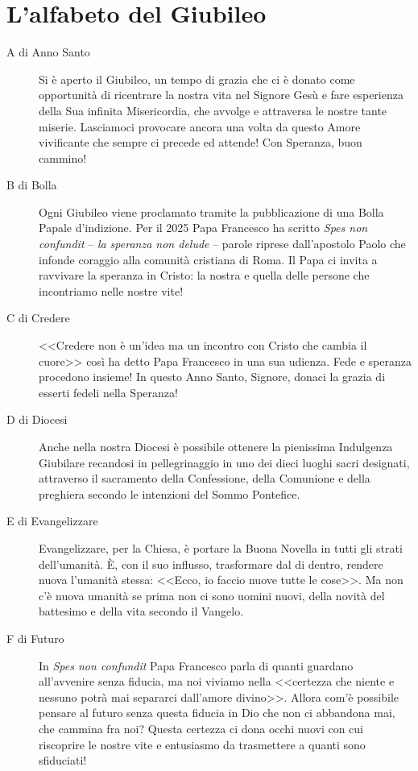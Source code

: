 \section{L'alfabeto del Giubileo}

\begin{description}
  \item[A di Anno Santo] Si è aperto il Giubileo, un tempo di grazia che ci è donato come opportunità di ricentrare la nostra vita nel Signore Gesù e fare esperienza della Sua infinita Misericordia, che avvolge e attraversa le nostre tante miserie. Lasciamoci provocare ancora una volta da questo Amore vivificante che sempre ci precede ed attende! Con Speranza, buon cammino!

  \item[B di Bolla] Ogni Giubileo viene proclamato tramite la pubblicazione di una Bolla Papale d'indizione. Per il 2025 Papa Francesco ha scritto \textit{Spes non confundit} -- \textit{la speranza non delude} -- parole riprese dall'apostolo Paolo che infonde coraggio alla comunità cristiana di Roma. Il Papa ci invita a ravvivare la speranza in Cristo: la nostra e quella delle persone che incontriamo nelle nostre vite!

  \item[C di Credere] <<Credere non è un'idea ma un incontro con Cristo che cambia il cuore>> così ha detto Papa Francesco in una sua udienza. Fede e speranza procedono insieme! In questo Anno Santo, Signore, donaci la grazia di esserti fedeli nella Speranza!

  \item[D di Diocesi] Anche nella nostra Diocesi è possibile ottenere la pienissima Indulgenza Giubilare recandosi in pellegrinaggio in uno dei dieci luoghi sacri designati, attraverso il sacramento della Confessione, della Comunione e della preghiera secondo le intenzioni del Sommo Pontefice.

  \item[E di Evangelizzare] Evangelizzare, per la Chiesa, è portare la Buona Novella in tutti gli strati dell'umanità. È, con il suo influsso, trasformare dal di dentro, rendere nuova l'umanità stessa: <<Ecco, io faccio nuove tutte le cose>>. Ma non c'è nuova umanità se prima non ci sono uomini nuovi, della novità del battesimo e della vita secondo il Vangelo.

  \item[F di Futuro] In \textit{Spes non confundit} Papa Francesco parla di quanti guardano all'avvenire senza fiducia, ma noi viviamo nella <<certezza che niente e nessuno potrà mai separarci dall'amore divino>>. Allora com'è possibile pensare al futuro senza questa fiducia in Dio che non ci abbandona mai, che cammina fra noi? Questa certezza ci dona occhi nuovi con cui riscoprire le nostre vite e entusiasmo da trasmettere a quanti sono sfiduciati!


\end{description}

